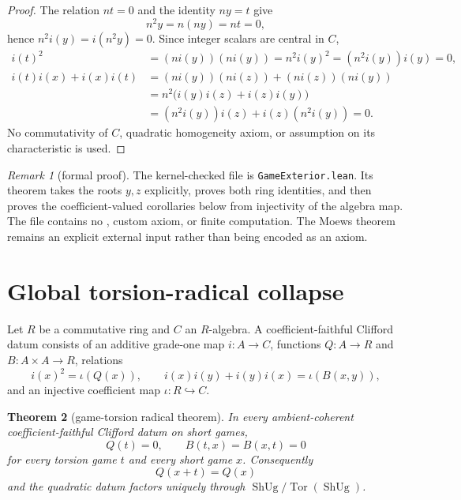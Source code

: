 \documentclass[11pt]{article}
\newtheorem{theorem}{Theorem}
\theoremstyle{definition}
\theoremstyle{remark}
\newtheorem{remark}[theorem]{Remark}
\newcommand{\ShUg}{\operatorname{ShUg}}
\newcommand{\Tor}{\operatorname{Tor}}
\begin{document}
\begin{proof}
The relation $nt=0$ and the identity $ny=t$ give
\[
 n^2y=n(ny)=nt=0,
\]
hence $n^2i(y)=i(n^2y)=0$.  Since integer scalars are central in $C$,
\[
\begin{aligned}
 i(t)^2
   &=(n i(y))(n i(y))
     =n^2 i(y)^2
     =(n^2i(y))i(y)=0,\\
 i(t)i(x)+i(x)i(t)
   &=(n i(y))(n i(z))+(n i(z))(n i(y))\\
   &=n^2\bigl(i(y)i(z)+i(z)i(y)\bigr)\\
   &=(n^2i(y))i(z)+i(z)(n^2i(y))=0.
\end{aligned}
\]
No commutativity of $C$, quadratic homogeneity axiom, or assumption on its
characteristic is used.
\end{proof}

\begin{remark}[formal proof]
The kernel-checked file is \texttt{GameExterior.lean}. Its theorem takes the roots
$y,z$ explicitly, proves both ring identities, and then proves the
coefficient-valued corollaries below from injectivity of the algebra map.  The
file contains no , custom axiom, or finite computation.  The
Moews theorem remains an explicit external input rather than being encoded as
an axiom.
\end{remark}

\section{Global torsion-radical collapse}

Let $R$ be a commutative ring and $C$ an $R$-algebra.  A
coefficient-faithful Clifford datum consists of an additive grade-one map
$i:A\to C$, functions $Q:A\to R$ and $B:A\times A\to R$, relations
\[
 i(x)^2=\iota(Q(x)),\qquad
 i(x)i(y)+i(y)i(x)=\iota(B(x,y)),
\]
and an injective coefficient map $\iota:R\hookrightarrow C$.

\begin{theorem}[game-torsion radical theorem]\label{thm:main}
In every ambient-coherent coefficient-faithful Clifford datum on
short games,
\[
 Q(t)=0,
 \qquad
 B(t,x)=B(x,t)=0
\]
for every torsion game $t$ and every short game $x$.  Consequently
\[
 Q(x+t)=Q(x)
\]
and the quadratic datum factors uniquely through
$\ShUg/\Tor(\ShUg)$.
\end{theorem}
\end{document}
